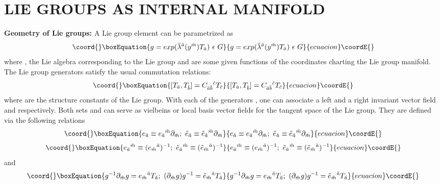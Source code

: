 \documentclass[a4paper,12pt]{article}
\begin{document}
\section{{\bf  LIE GROUPS AS INTERNAL MANIFOLD}}
{\bf Geometry of Lie groups:} A Lie group element \coordHE{} can be parametrized as 
\begin{equation}\coord{}\boxEquation{
g=exp(\breve{\la}^{\as}(y^{\ms})T_{\as})\ \e\ G
}{
g=exp(\breve{\la}^{\as}(y^{\ms})T_{\as})\ \e\ G
}{ecuacion}\coordE{}\end{equation}
where \coordHE{}, the Lie algebra corresponding to the Lie group \coordHE{} and \coordHE{} are some given functions of the coordinates \coordHE{} charting the Lie group manifold. The Lie group generators \coordHE{} satisfy the usual commutation relations:
\begin{equation}\coord{}\boxEquation{
[T_{\as},T_{\bs}]=C_{\as\bs}{}^{\cs}T_{\cs}
}{
[T_{\as},T_{\bs}]=C_{\as\bs}{}^{\cs}T_{\cs}
}{ecuacion}\coordE{}\end{equation}
where \coordHE{} are the structure constants of the Lie group. With each of the generators \coordHE{}, one can associate a left and a right invariant vector field \coordHE{} and \myHighlight{$\et_{\as}$}\coordHE{} respectively. Both sets \coordHE{} and \myHighlight{$\{\et_{\as}\}$}\coordHE{} can serve as vielbeins or local basis vector fields for the tangent space of the Lie group. They are defined via the following relations
\begin{equation}\coord{}\boxEquation{
e_{\as}\equiv e_{\as}{}^{\ms}\p_{\ms};\ \et_{\as}\equiv \et_{\as}{}^{\ms}\p_{\ms}
}{
e_{\as}\equiv e_{\as}{}^{\ms}\p_{\ms};\ \et_{\as}\equiv \et_{\as}{}^{\ms}\p_{\ms}
}{ecuacion}\coordE{}\end{equation}
\begin{equation}\coord{}\boxEquation{
e_{\as}{}^{\ms}\equiv (e_{\ms}{}^{\as})^{-1};\ \et_{\as}{}^{\ms}\equiv (\et_{\ms}{}^{\as})^{-1}
}{
e_{\as}{}^{\ms}\equiv (e_{\ms}{}^{\as})^{-1};\ \et_{\as}{}^{\ms}\equiv (\et_{\ms}{}^{\as})^{-1}
}{ecuacion}\coordE{}\end{equation}
and
\begin{equation}\coord{}\boxEquation{
g^{-1}\p_{\ms}g=e_{\ms}{}^{\as}T_{\as} ;\ (\p_{\ms}g)g^{-1}=\et_{\ms}{}^{\as}T_{\as}
}{
g^{-1}\p_{\ms}g=e_{\ms}{}^{\as}T_{\as} ;\ (\p_{\ms}g)g^{-1}=\et_{\ms}{}^{\as}T_{\as}
}{ecuacion}\coordE{}\end{equation}
\end{document}
